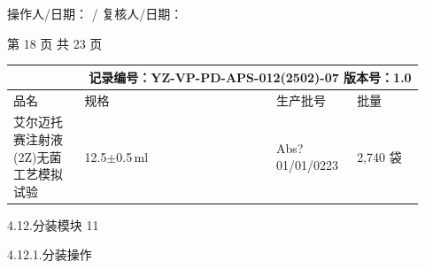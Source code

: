 \documentclass[UTF8,10pt,a4paper,fontset=fandol]{ctexart}
\newcommand{\fieldvalue}[1]{#1}
\newcommand{\handwritten}[1]{#1}
\begin{document}
\handwritten{}

操作人/日期：\underline{\hspace{2.2cm}}
\hfill
\handwritten{/}
复核人/日期：\underline{\hspace{2.2cm}}

\vfill
\begin{center}
\small 第 18 页 共 23 页
\end{center}

\newpage

\noindent
\begin{tabular}{|p{0.16\linewidth}|p{0.43\linewidth}|p{0.18\linewidth}|p{0.15\linewidth}|}
\hline
\multicolumn{4}{r|}{记录编号：YZ-VP-PD-APS-012(2502)-07 \quad 版本号：1.0}\\[-2pt]
\hline
品名 & 规格 & 生产批号 & 批量\\
\hline
艾尔迈托赛注射液(2Z)无菌工艺模拟试验
&
12.5$\pm$0.5\,ml
&
\fieldvalue{\handwritten{Abs?01/01/0223}}
&
\fieldvalue{\handwritten{2,740}} 袋
\\
\hline
\end{tabular}

\vspace{0.15cm}

4.12.\quad 分装模块 11

\vspace{0.1cm}

4.12.1.\quad 分装操作
\end{document}

